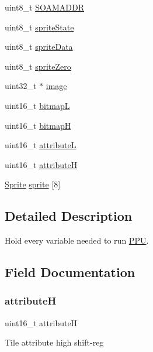 \begin{DoxyCompactItemize}
\item 
uint8\+\_\+t \hyperlink{struct_p_p_u_a496affeb5a831e004a615b888e98e85e}{S\+O\+A\+M\+A\+D\+DR}
\item 
uint8\+\_\+t \hyperlink{struct_p_p_u_a22a6738b7311f8741c18f199215724c6}{sprite\+State}
\item 
uint8\+\_\+t \hyperlink{struct_p_p_u_abf381ae655282a3beee0563e6d6bce75}{sprite\+Data}
\item 
uint8\+\_\+t \hyperlink{struct_p_p_u_ab7fdc3f45d8fd245221d2dd1cca96d7d}{sprite\+Zero}
\item 
uint32\+\_\+t $\ast$ \hyperlink{struct_p_p_u_ac8986adb5b1723b0ee8c6d7b28ab921b}{image}
\item 
uint16\+\_\+t \hyperlink{struct_p_p_u_adc60b544127ab0cf3f48bec16b090fe0}{bitmapL}
\item 
uint16\+\_\+t \hyperlink{struct_p_p_u_a0487b25ddf967f4aca280bca7c67336c}{bitmapH}
\item 
uint16\+\_\+t \hyperlink{struct_p_p_u_a2d86ab0c40b902c893019a70beda27b0}{attributeL}
\item 
uint16\+\_\+t \hyperlink{struct_p_p_u_a22a3cfb668761c57e4e6667247ee591d}{attributeH}
\item 
\hyperlink{struct_sprite}{Sprite} \hyperlink{struct_p_p_u_ae5755bc7e42d21e0c224ffb1f3dfef35}{sprite} \mbox{[}8\mbox{]}
\end{DoxyCompactItemize}


\subsection{Detailed Description}
Hold every variable needed to run \hyperlink{struct_p_p_u}{P\+PU}. 

\subsection{Field Documentation}
\mbox{\label{struct_p_p_u_a22a3cfb668761c57e4e6667247ee591d}} 
\subsubsection{\texorpdfstring{attributeH}{attributeH}}
{\footnotesize\ttfamily uint16\+\_\+t attributeH}

Tile attribute high shift-\/reg \mbox{\label{struct_p_p_u_a2d86ab0c40b902c893019a70beda27b0}} 
